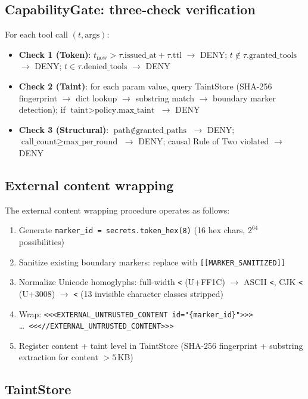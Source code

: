\documentclass[pdflatex,sn-nature]{sn-jnl}%
\theoremstyle{thmstyleone}%
\theoremstyle{thmstyletwo}%
\theoremstyle{thmstylethree}%
\begin{document}
\subsection{CapabilityGate: three-check verification}\label{subsec:meth-gate}

For each tool call $(t, \text{args})$:
\begin{itemize}
  \item \textbf{Check 1 (Token)}: $t_{\text{now}} > \tau.\text{issued\_at} + \tau.\text{ttl}$ $\to$ DENY;\; $t \notin \tau.\text{granted\_tools}$ $\to$ DENY;\; $t \in \tau.\text{denied\_tools}$ $\to$ DENY
  \item \textbf{Check 2 (Taint)}: for each param value, query TaintStore (SHA-256 fingerprint $\to$ dict lookup $\to$ substring match $\to$ boundary marker detection); if $\text{taint} > \text{policy.max\_taint}$ $\to$ DENY
  \item \textbf{Check 3 (Structural)}: $\text{path} \notin \text{granted\_paths}$ $\to$ DENY;\; $\text{call\_count} \geq \text{max\_per\_round}$ $\to$ DENY;\; causal Rule of Two violated $\to$ DENY
\end{itemize}

\subsection{External content wrapping}\label{subsec:meth-wrap}

The external content wrapping procedure operates as follows:
\begin{enumerate}
  \item Generate \texttt{marker\_id = secrets.token\_hex(8)} (16 hex chars, $2^{64}$ possibilities)
  \item Sanitize existing boundary markers: replace with \texttt{[[MARKER\_SANITIZED]]}
  \item Normalize Unicode homoglyphs: full-width \texttt{<} (U+FF1C) $\to$ ASCII \texttt{<}, CJK \texttt{<} (U+3008) $\to$ \texttt{<} (13 invisible character classes stripped)
  \item Wrap: \texttt{<<<EXTERNAL\_UNTRUSTED\_CONTENT id="\{marker\_id\}">>>} \ldots\ \texttt{<<<//EXTERNAL\_UNTRUSTED\_CONTENT>>>}
  \item Register content + taint level in TaintStore (SHA-256 fingerprint + substring extraction for content ${>}5$\,KB)
\end{enumerate}

\subsection{TaintStore}\label{subsec:meth-taintstore}
\end{document}
